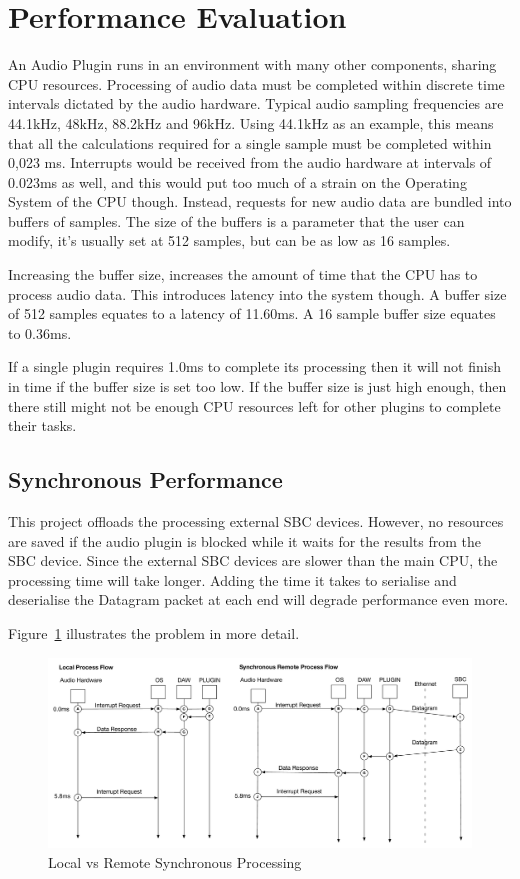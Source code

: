 \section{Performance Evaluation}

An Audio Plugin runs in an environment with many other components, sharing CPU resources. Processing of audio data must be completed within discrete time intervals dictated by the audio hardware. Typical audio sampling frequencies are 44.1kHz, 48kHz, 88.2kHz and 96kHz. Using 44.1kHz as an example, this means that all the calculations required for a single sample must be completed within 0,023 ms. Interrupts would be received from the audio hardware at intervals of 0.023ms as well, and this would put too much of a strain on the Operating System of the CPU though. Instead, requests for new audio data are bundled into buffers of samples. The size of the buffers is a parameter that the user can modify, it's usually set at 512 samples, but can be as low as 16 samples.

Increasing the buffer size, increases the amount of time that the CPU has to process audio data. This introduces latency into the system though. A buffer size of 512 samples equates to a latency of 11.60ms. A 16 sample buffer size equates to 0.36ms.

If a single plugin requires 1.0ms to complete its processing then it will not finish in time if the buffer size is set too low. If the buffer size is just high enough, then there still might not be enough CPU resources left for other plugins to complete their tasks.

\subsection{Synchronous Performance}

This project offloads the processing external SBC devices. However, no resources are saved if the audio plugin is blocked while it waits for the results from the SBC device. Since the external SBC devices are slower than the main CPU, the processing time will take longer. Adding the time it takes to serialise and deserialise the Datagram packet at each end will degrade performance even more.

Figure~\ref{fig:local_vs_remote} illustrates the problem in more detail.

\begin{figure}[H]
    \centering
    \includegraphics[width=\textwidth]{assets/conclusion/process_flow_compared.pdf}
    \caption{Local vs Remote Synchronous Processing}
    \label{fig:local_vs_remote}
\end{figure}

